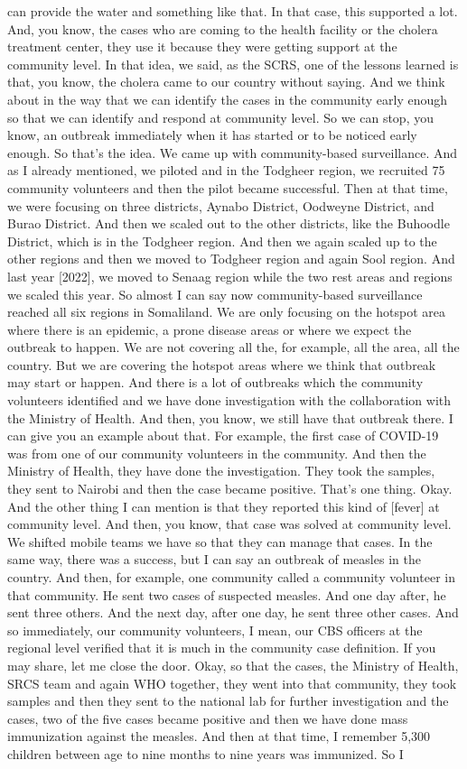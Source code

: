 can provide the water and something like that. In that case, this supported a lot. And, you know, the cases who are coming to the health facility or the cholera treatment center, they use it because they were getting support at the community level. In that idea, we said, as the SCRS, one of the lessons learned is that, you know, the cholera came to our country without saying. And we think about in the way that we can identify the cases in the community early enough so that we can identify and respond at community level. So we can stop, you know, an outbreak immediately when it has started or to be noticed early enough. So that's the idea. We came up with community-based surveillance. And as I already mentioned, we piloted and in the Todgheer region, we recruited 75 community volunteers and then the pilot became successful. Then at that time, we were focusing on three districts, Aynabo District, Oodweyne District, and Burao District. And then we scaled out to the other districts, like the Buhoodle District, which is in the Todgheer region. And then we again scaled up to the other regions and then we moved to Todgheer region and again Sool region. And last year [2022], we moved to Senaag region while the two rest areas and regions we scaled this year. So almost I can say now community-based surveillance reached all six regions in Somaliland. We are only focusing on the hotspot area where there is an epidemic, a prone disease areas or where we expect the outbreak to happen. We are not covering all the, for example, all the area, all the country. But we are covering the hotspot areas where we think that outbreak may start or happen. And there is a lot of outbreaks which the community volunteers identified and we have done investigation with the collaboration with the Ministry of Health. And then, you know, we still have that outbreak there. I can give you an example about that. For example, the first case of COVID-19 was from one of our community volunteers in the community. And then the Ministry of Health, they have done the investigation. They took the samples, they sent to Nairobi and then the case became positive. That's one thing. Okay. And the other thing I can mention is that they reported this kind of [fever] at community level. And then, you know, that case was solved at community level. We shifted mobile teams we have so that they can manage that cases. In the same way, there was a success, but I can say an outbreak of measles in the country. And then, for example, one community called a community volunteer in that community. He sent two cases of suspected measles. And one day after, he sent three others. And the next day, after one day, he sent three other cases. And so immediately, our community volunteers, I mean, our CBS officers at the regional level verified that it is much in the community case definition. If you may share, let me close the door. Okay, so that the cases, the Ministry of Health, SRCS team and again WHO together, they went into that community, they took samples and then they sent to the national lab for further investigation and the cases, two of the five cases became positive and then we have done mass immunization against the measles. And then at that time, I remember 5,300 children between age to nine months to nine years was immunized. So I 